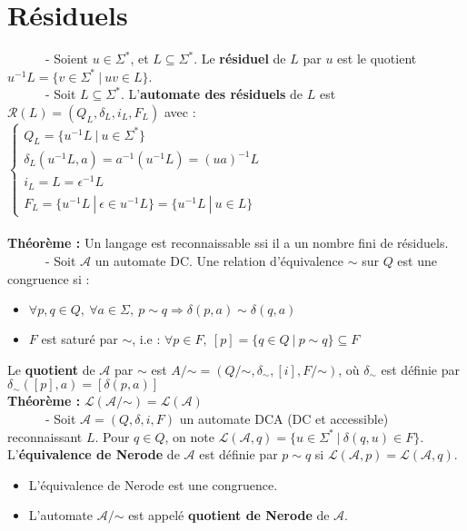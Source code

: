 \documentclass[11pt,a4paper]{article}
\begin{document}
\section{Résiduels}

\ \ \ \ \ \ - Soient $u \in \Sigma^*$, et $L \subseteq \Sigma^*$. Le \textbf{résiduel} de $L$ par $u$ est le quotient $u^{-1}L=\{v \in \Sigma^* \ | \ uv \in L \}$. \\

\ \ \ \ \ \ - Soit $L \subseteq \Sigma^*$. L'\textbf{automate des résiduels} de $L$ est $\mathcal{R}(L) = (Q_L, \delta_L, i_L, F_L)$ avec : \\
 $\begin{cases} Q_L = \{u^{-1}L \ | \ u \in \Sigma^* \} \\ \delta_L(u^{-1}L,a)=a^{-1}(u^{-1}L)=(ua)^{-1}L \\ i_L = L = \epsilon^{-1}L \\ F_L = \{u^{-1}L \ | \ \epsilon \in u^{-1}L \} = \{u^{-1}L \ | \ u \in L \} \end{cases}$ \\ \\

\textbf{Théorème :} Un langage est reconnaissable ssi il a un nombre fini de résiduels. \\ 

\ \ \ \ \ \ - Soit $\mathcal{A}$ un automate DC. Une relation d'équivalence $\sim$ sur $Q$ est une congruence si :
\begin{itemize}
\item $\forall p,q \in Q, \ \forall a \in \Sigma, \ p \sim q \Rightarrow \delta(p,a) \sim \delta(q,a)$
\item $F$ est saturé par $\sim$, i.e : $\forall p \in F, \ [p]=\{q \in Q \ | \ p \sim q \} \subseteq F$
\end{itemize}
Le \textbf{quotient} de $\mathcal{A}$ par $\sim$ est $A/\mathord\sim = (Q/\mathord\sim,\delta_{\sim},[i],F/\mathord\sim)$, où $\delta_{\sim}$ est définie par $\delta_{\sim}([p],a)=[\delta	(p,a)]$ \\

\textbf{Théorème :} $\mathcal{L}(\mathcal{A}/\mathord\sim) = \mathcal{L}(\mathcal{A})$ \\

\ \ \ \ \ \ - Soit $\mathcal{A}=(Q,\delta,i,F)$ un automate DCA (DC et accessible) reconnaissant $L$. Pour $q \in Q$, on note $\mathcal{L}(\mathcal{A},q)=\{u \in \Sigma^* \ | \ \delta(q,u) \in F \}$. L'\textbf{équivalence de Nerode} de $\mathcal{A}$ est définie par $p \sim q$ si $\mathcal{L}(\mathcal{A},p)=\mathcal{L}(\mathcal{A},q)$.
\begin{itemize}
\item L'équivalence de Nerode est une congruence. 
\item L'automate $\mathcal{A}/\mathord\sim$ est appelé \textbf{quotient de Nerode} de $\mathcal{A}$. \\
\end{itemize}
\end{document}
